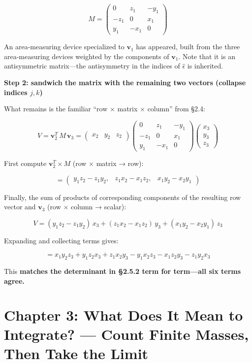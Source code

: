 \[M = \begin{pmatrix} 0 & z_1 & -y_1 \\ -z_1 & 0 & x_1 \\ y_1 & -x_1 & 0 \end{pmatrix}\]

An area-measuring device specialized to \(\mathbf{v}_1\) has appeared,
built from the three area-measuring devices weighted by the components
of \(\mathbf{v}_1\). Note that it is an antisymmetric matrix---the
antisymmetry in the indices of \(\widehat{\epsilon}\) is inherited.

\textbf{Step 2: sandwich the matrix with the remaining two vectors
(collapse indices \(j,k\))}

What remains is the familiar ``row \(\times\) matrix \(\times\) column''
from §2.4:

\[V = \mathbf{v}_2^T\, M\, \mathbf{v}_3 = \begin{pmatrix} x_2 & y_2 & z_2 \end{pmatrix} \begin{pmatrix} 0 & z_1 & -y_1 \\ -z_1 & 0 & x_1 \\ y_1 & -x_1 & 0 \end{pmatrix} \begin{pmatrix} x_3 \\ y_3 \\ z_3 \end{pmatrix}\]

First compute \(\mathbf{v}_2^T \times M\) (row \(\times\) matrix → row):

\[= \begin{pmatrix} y_1 z_2 - z_1 y_2, & z_1 x_2 - x_1 z_2, & x_1 y_2 - x_2 y_1 \end{pmatrix}\]

Finally, the sum of products of corresponding components of the
resulting row vector and \(\mathbf{v}_3\) (row \(\times\) column →
scalar):

\[V = (y_1 z_2 - z_1 y_2)\,x_3 + (z_1 x_2 - x_1 z_2)\,y_3 + (x_1 y_2 - x_2 y_1)\,z_3\]

Expanding and collecting terms gives:

\[= x_1 y_2 z_3 + y_1 z_2 x_3 + z_1 x_2 y_3 - y_1 x_2 z_3 - x_1 z_2 y_3 - z_1 y_2 x_3\]

This \textbf{matches the determinant in §2.5.2 term for term---all six
terms agree.}

\newpage

\hypertarget{chapter-3-what-does-it-mean-to-integrate-count-finite-masses-then-take-the-limit}{%
\chapter{Chapter 3: What Does It Mean to Integrate? --- Count Finite
Masses, Then Take the
Limit}\label{chapter-3-what-does-it-mean-to-integrate-count-finite-masses-then-take-the-limit}}


